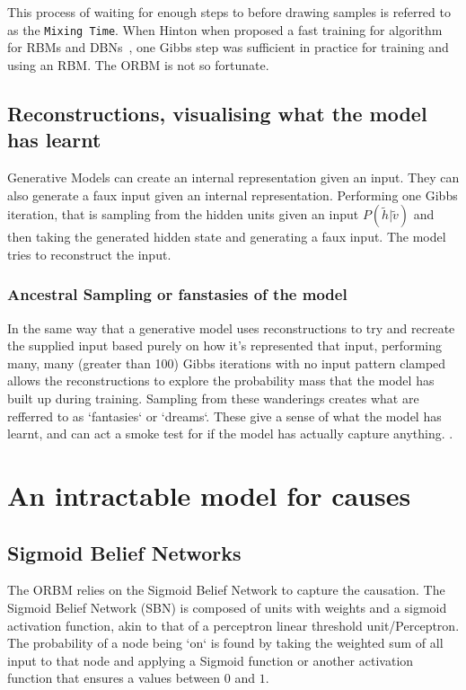 This process of waiting for enough steps to before drawing samples is referred to as the \texttt{Mixing Time}. When Hinton when proposed a fast training for algorithm for RBMs and DBNs~\cite{Hinton:2006:FLA:1161603.1161605}, one Gibbs step was sufficient in practice for training and using an RBM. The ORBM is not so fortunate.


\subsection{Reconstructions, visualising what the model has learnt}

Generative Models can create an internal representation given an input. They can also generate a faux input given an internal representation. Performing one Gibbs iteration, that is sampling from the hidden units given an input $ P(\tilde{h}|\tilde{v}) $ and then taking the generated hidden state and generating a faux input. The model tries to reconstruct the input.

  \subsubsection{Ancestral Sampling or fanstasies of the model}

  In the same way that a generative model uses reconstructions to try and recreate the  supplied input based purely on how it's represented that input, performing many, many (greater than 100) Gibbs iterations with no input pattern clamped allows the reconstructions to explore the probability mass that the model has built up during training. Sampling from these wanderings creates what are refferred to as `fantasies` or `dreams`. These give a sense of what the model has learnt, and can act a smoke test for if the model has actually capture anything.
  .

  \section{An intractable model for causes}
    \subsection{Sigmoid Belief Networks}

    The ORBM relies on the Sigmoid Belief Network to capture the causation. The Sigmoid Belief Network (SBN) is composed of units with weights and a sigmoid activation function, akin to that of a perceptron linear threshold unit/Perceptron. The probability of a node being `on` is found by taking the weighted sum of all input to that node and applying a Sigmoid function or another activation function that ensures a values between $0$ and $1$.

